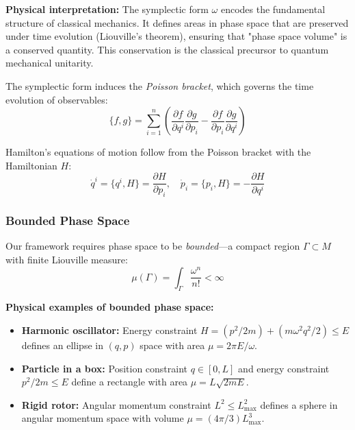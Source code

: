 \documentclass[twocolumn,10pt]{article}
\theoremstyle{remark}
\begin{document}
\textbf{Physical interpretation:} The symplectic form $\omega$ encodes the fundamental structure of classical mechanics. It defines areas in phase space that are preserved under time evolution (Liouville's theorem), ensuring that "phase space volume" is a conserved quantity. This conservation is the classical precursor to quantum mechanical unitarity.

The symplectic form induces the \textit{Poisson bracket}, which governs the time evolution of observables:
\begin{equation}
    \{f, g\} = \sum_{i=1}^{n} \left( \frac{\partial f}{\partial q^i} \frac{\partial g}{\partial p_i} - \frac{\partial f}{\partial p_i} \frac{\partial g}{\partial q^i} \right)
    \label{eq:poisson_bracket}
\end{equation}

Hamilton's equations of motion follow from the Poisson bracket with the Hamiltonian $H$:
\begin{equation}
    \dot{q}^i = \{q^i, H\} = \frac{\partial H}{\partial p_i}, \quad 
    \dot{p}_i = \{p_i, H\} = -\frac{\partial H}{\partial q^i}
    \label{eq:hamilton_equations}
\end{equation}

\subsubsection{Bounded Phase Space}

Our framework requires phase space to be \textit{bounded}—a compact region $\Gamma \subset M$ with finite Liouville measure:
\begin{equation}
    \mu(\Gamma) = \int_\Gamma \frac{\omega^n}{n!} < \infty
    \label{eq:liouville_measure}
\end{equation}

\textbf{Physical examples of bounded phase space:}
\begin{itemize}
    \item \textbf{Harmonic oscillator:} Energy constraint $H = (p^2/2m) + (m\omega^2 q^2/2) \leq E$ defines an ellipse in $(q, p)$ space with area $\mu = 2\pi E/\omega$.
    
    \item \textbf{Particle in a box:} Position constraint $q \in [0, L]$ and energy constraint $p^2/2m \leq E$ define a rectangle with area $\mu = L\sqrt{2mE}$.
    
    \item \textbf{Rigid rotor:} Angular momentum constraint $L^2 \leq L_{\max}^2$ defines a sphere in angular momentum space with volume $\mu = (4\pi/3)L_{\max}^3$.
\end{itemize}
\end{document}
